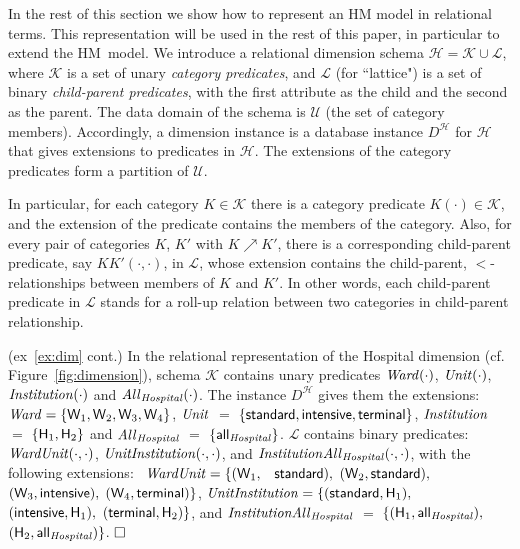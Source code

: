 \documentclass[format=acmsmall, review=false, screen=true]{acmart}
\newcommand{\boxtheorem}{\ensuremath{\hfill \Box}}
\newcommand{\mc}[1]{\mathcal{ #1}}
\newcommand{\mscr}[1]{\mathscr{ #1}}
\newcommand{\nit}[1]{{\it #1}}
\newcommand{\hm}{HM}
\newcommand{\red}[1]{{#1}}
\begin{document}
In the rest of this section we show how to represent an HM model in relational terms. This representation will be used in the rest of this paper, in particular to extend the \hm \ model. We introduce a relational dimension schema $\mc{H}=\mc{K}\cup \mc{L}$, where $\mc{K}$ is a set of unary {\em category predicates}, and $\mc{L}$ (for ``lattice") is a set of binary {\em child-parent predicates}, with the first attribute as the child and the second as the  parent. The data domain of the schema is $\mc{U}$ (the set of category members).
Accordingly, a dimension instance is a database instance $D^\mc{H}$ for $\mc{H}$ that gives extensions to predicates in $\mc{H}$. The extensions of the category predicates form a partition of $\mc{U}$.

 In particular, for each category $K \in \mscr{K}$ there is a category predicate $K(\cdot) \in \mc{K}$, and the extension of the predicate contains the members of the category. Also, for every pair of categories $K$, $K'$ with $K \nearrow K'$, there is a corresponding child-parent predicate, say $K\!K'(\cdot,\cdot)$, in $\mc{L}$, whose extension contains the child-parent, $<$-relationships between members of $K$ and $K'$. In other words, each child-parent predicate in $\mc{L}$ stands for a roll-up relation between two  categories in child-parent relationship.

\vspace{-2mm}
\begin{example} \label{ex:hm} (ex~\ref{ex:dim} cont.) In the relational representation of the {\sf Hospital} dimension \red{(cf. Figure~\ref{fig:dimension})}, schema $\mc{K}$ contains unary predicates $\nit{Ward}(\cdot)$, $\nit{Unit}(\cdot)$, $\nit{Institution}(\cdot)$  and $\nit{All}_\nit{Hospital}(\cdot)$. The instance $D^\mc{H}$ gives them the  extensions:  $\nit{Ward} = \{{\sf W}_1,{\sf W}_2,{\sf W}_3,{\sf W}_4\}$, $\nit{Unit}$ $=$ $\{{\sf standard},{\sf intensive},{\sf terminal}\}$, $\nit{Institution}$ $=$ $\{{\sf H}_1,{\sf H}_2\}$  and $\nit{All}_\nit{Hospital}$ $=$ $\{{\sf all}_\nit{Hospital}\}$. $\mc{L}$ contains binary predicates: $\nit{WardUnit}(\cdot,\cdot)$, $\nit{UnitInstitution}(\cdot,\cdot)$, and $\nit{Institution}\nit{All}_\nit{Hospital}(\cdot,\cdot)$, with the following extensions: \   $\nit{WardUnit}=\{({\sf W}_1,$ \ $ {\sf standard}),$ $({\sf W}_2, {\sf standard}),$ $({\sf W}_3, {\sf intensive}),$
  $({\sf W}_4, {\sf terminal})\}$,   $\nit{UnitInstitution} = \{({\sf standard},{\sf H}_1),$ \\ $({\sf intensive}, {\sf H}_1),$ $({\sf terminal}, {\sf H}_2)\}$, and $\nit{InstitutionAll}_\nit{Hospital}$ $=$ $\{({\sf H}_1,{\sf all}_\nit{Hospital}),$ $ ({\sf H}_2,{\sf all}_\nit{Hospital})\}$.
\boxtheorem\end{example}
\vspace{-2mm}
\end{document}

